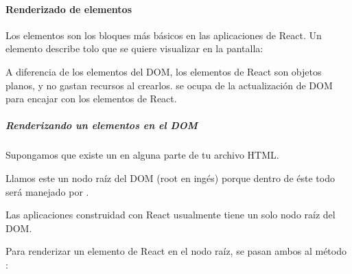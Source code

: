 \paragraph{Renderizado de elementos}
\label{\detokenize{reactjs:renderizado-de-elementos}}
Los elementos son los bloques más básicos en las aplicaciones de React.
Un elemento describe tolo que se quiere visualizar en la pantalla:

%
\begin{sphinxVerbatim}[commandchars=\\\{\}]
    
\end{sphinxVerbatim}

A diferencia de los elementos del DOM, los elementos de React son objetos
planos, y no gastan recursos al crearlos.  se ocupa de la
actualización de DOM para encajar con los elementos de React.


\subparagraph{Renderizando un elementos en el DOM}
\label{\detokenize{reactjs:renderizando-un-elementos-en-el-dom}}
Supongamos que existe un  en alguna parte de tu archivo HTML.

%
\begin{sphinxVerbatim}[commandchars=\\\{\}]
 
\end{sphinxVerbatim}

Llamos este un nodo raíz del DOM (root en ingés) porque dentro de éste todo
será manejado por .

Las aplicaciones construidad con React usualmente tiene un solo nodo raíz del
DOM.

Para renderizar un elemento de React en el nodo raíz, se pasan ambos al método
:

%
\begin{sphinxVerbatim}[commandchars=\\\{\}]
    
 
\end{sphinxVerbatim}

